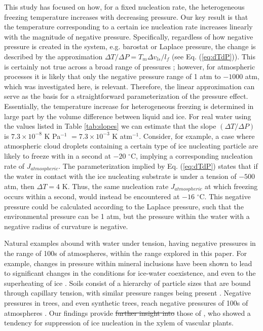 \documentclass[journal abbreviation, manuscript]{copernicus}
\providecommand{\DIFadd}[1]{{\protect\color{blue}\uwave{#1}}} %
\providecommand{\DIFdel}[1]{{\protect\color{red}\sout{#1}}}                      %
\providecommand{\DIFaddbegin}{} %
\providecommand{\DIFaddend}{} %
\providecommand{\DIFdelbegin}{} %
\providecommand{\DIFdelend}{} %
\begin{document}
This study has focused on how, for a fixed nucleation rate, the heterogeneous freezing temperature increases with decreasing pressure. Our key result is that the temperature corresponding to a certain ice nucleation rate increases linearly with the magnitude of negative pressure. Specifically, regardless of how negative pressure is created in the system, e.g. barostat or Laplace pressure, the change is described by the approximation $\Delta T/\Delta P = T_m \Delta v_{ls} / l_f$ (see Eq. (\ref{eq:dTdP})). This is certainly not true across a broad range of pressures \citep[e.g.,][]{bianco2021, espinosa2016}; however, for atmospheric processes it is likely that only the negative pressure range of 1 atm to $-1000$ atm, which was investigated here, is relevant. Therefore, the linear approximation can serve as the basis for a straightforward parameterization of the pressure effect. Essentially, the temperature increase for heterogeneous freezing is determined in large part by the volume difference between liquid and ice. For real water using the values listed in Table \ref{tab:slopes} we can estimate that the slope $(\Delta T/\Delta P)$ is $7.3 \times 10^{-8}$ K Pa$^{-1}$ $= 7.3 \times 10^{-3}$ K atm$^{-1}$. Consider, for example, a case where atmospheric cloud droplets containing a certain type of ice nucleating particle are likely to freeze with in a second at $-20$ $^\circ$C, implying a corresponding nucleation rate of $J_{atmospheric}$. The parameterization implied by Eq. (\ref{eq:dTdP}) states that if the water in contact with the ice nucleating substrate is under a tension of $-500$ atm, then $\Delta T = 4$ K. Thus, the same nucleation rate $J_{atmospheric}$ at which freezing occurs within a second, would instead be encountered at $-16$ $^\circ$C. This negative pressure could be calculated according to the Laplace pressure, such that the environmental pressure can be 1 atm, but the pressure within the water with a negative radius of curvature is negative.

Natural examples abound with water under tension, having negative pressures in the range of 100s of atmospheres, within the range explored in this paper. For example, changes in pressure within mineral inclusions have been shown to lead to significant changes in the conditions for ice-water coexistence, and even to the superheating of ice \citep{roedder1967metastable}. Soils consist of a hierarchy of particle sizes that are bound through capillary tension, with similar pressure ranges being present \citep{seiphoori2020}. Negative pressures in trees, and even synthetic trees, reach negative pressures of 100s of atmospheres \citep{wheeler2008transpiration}. Our findings provide \DIFdelbegin \DIFdel{further insight into }\DIFdelend \DIFaddbegin \DIFadd{additional perspectives to }\DIFaddend those of \citet{lintunen2013anatomical}, who showed a tendency for suppression of ice nucleation in the xylem of vascular plants. 
\end{document}
